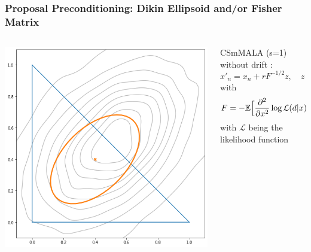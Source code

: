 \begin{frame}[t]
    \frametitle{Proposal Preconditioning: Dikin Ellipsoid and/or Fisher Matrix}
    \begin{columns}
    \begin{column}{0.45\textwidth}
        \begin{center}
        \includegraphics[width=\textwidth]{imgs/fisher-ellipsoid.png}
        \end{center}
    \end{column}
    \begin{column}{0.45\textwidth}
        CSmMALA (s=1) without drift \cite{Theorell2019}:
        \[
            x'_{n} = x_n + rF^{-1/2}z, \quad z \sim \mathcal{N}(0,I)
        \]
        with
        \[
            F = -\mathbb{E}\Big[\pdv[2]{x}\log \mathcal{L}(d|x)\Big| x \Big], 
        \]
        with $\mathcal{L}$ being the likelihood function
    \end{column}
    \end{columns}
\end{frame}

